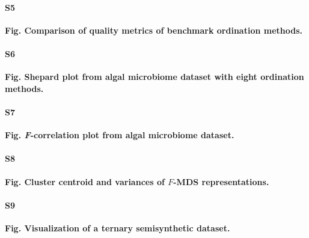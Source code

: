 \documentclass[10pt,letterpaper]{article}
\newcommand{\1}{{\rm 1}\kern-0.24em{\rm I}}
\begin{document}
\paragraph*{S5}\hspace{-2ex}
\label{fig:sim_eval_all}
\textbf{Fig. Comparison of quality metrics of benchmark ordination methods.}

\paragraph*{S6}\hspace{-2ex}
\label{fig:shepard_alga_all}
\textbf{Fig. Shepard plot from algal microbiome dataset with eight ordination methods.}

\paragraph*{S7}\hspace{-2ex}
\label{fig:f_corr_alga_all}
\textbf{Fig. \textit{F}-correlation plot from algal microbiome dataset.}

\paragraph*{S8}\hspace{-2ex}
\label{fig:fmds_rep_analysis}
\textbf{Fig. Cluster centroid and variances of $F$-MDS representations.} 

\paragraph*{S9}\hspace{-2ex}
\label{fig:sim_ternary_vis}
\textbf{Fig. Visualization of a ternary semisynthetic dataset.}
\end{document}
